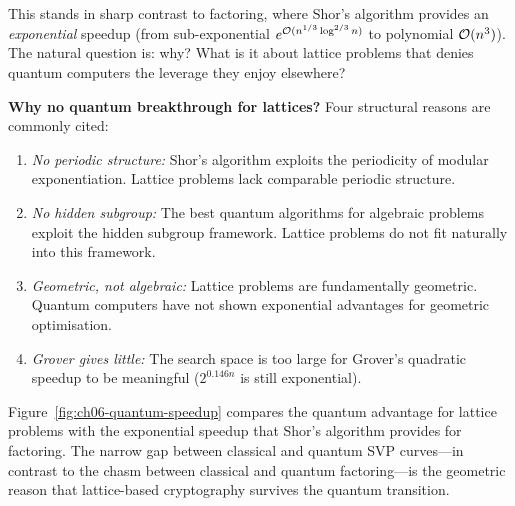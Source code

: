 This stands in sharp contrast to factoring, where Shor's algorithm provides an \emph{exponential} speedup (from sub-exponential $e^{\mathcal{O}(n^{1/3}\log^{2/3}n)}$ to polynomial $\mathcal{O}(n^3)$).  The natural question is: why?  What is it about lattice problems that denies quantum computers the leverage they enjoy elsewhere?

\begin{svgraybox}
\textbf{Why no quantum breakthrough for lattices?}
Four structural reasons are commonly cited:
\begin{enumerate}
\item \emph{No periodic structure:} Shor's algorithm exploits the periodicity of modular exponentiation.  Lattice problems lack comparable periodic structure.
\item \emph{No hidden subgroup:} The best quantum algorithms for algebraic problems exploit the hidden subgroup framework.  Lattice problems do not fit naturally into this framework.
\item \emph{Geometric, not algebraic:} Lattice problems are fundamentally geometric.  Quantum computers have not shown exponential advantages for geometric optimisation.
\item \emph{Grover gives little:} The search space is too large for Grover's quadratic speedup to be meaningful ($2^{0.146n}$ is still exponential).
\end{enumerate}
\end{svgraybox}

Figure~\ref{fig:ch06-quantum-speedup} compares the quantum advantage for lattice problems with the exponential speedup that Shor's algorithm provides for factoring.  The narrow gap between classical and quantum SVP curves---in contrast to the chasm between classical and quantum factoring---is the geometric reason that lattice-based cryptography survives the quantum transition.

